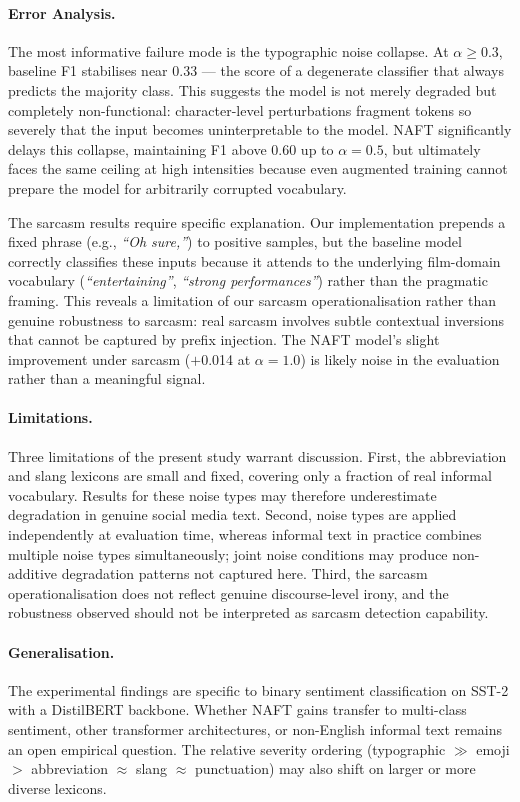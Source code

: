 \documentclass[sigconf]{acmart}
\begin{document}
\paragraph{Error Analysis.}
The most informative failure mode is the typographic noise
collapse.
At $\alpha \geq 0.3$, baseline F1 stabilises near 0.33 — the
score of a degenerate classifier that always predicts the majority
class.
This suggests the model is not merely degraded but completely
non-functional: character-level perturbations fragment tokens so
severely that the input becomes uninterpretable to the model.
NAFT significantly delays this collapse, maintaining F1 above 0.60
up to $\alpha=0.5$, but ultimately faces the same ceiling at high
intensities because even augmented training cannot prepare the
model for arbitrarily corrupted vocabulary.

The sarcasm results require specific explanation.
Our implementation prepends a fixed phrase (e.g.,
\textit{``Oh sure,''}) to positive samples, but the baseline
model correctly classifies these inputs because it attends to the
underlying film-domain vocabulary (\textit{``entertaining''},
\textit{``strong performances''}) rather than the pragmatic
framing.
This reveals a limitation of our sarcasm operationalisation rather
than genuine robustness to sarcasm: real sarcasm involves subtle
contextual inversions that cannot be captured by prefix injection.
The NAFT model's slight improvement under sarcasm ($+$0.014 at
$\alpha=1.0$) is likely noise in the evaluation rather than a
meaningful signal.

\paragraph{Limitations.}
Three limitations of the present study warrant discussion.
First, the abbreviation and slang lexicons are small and fixed,
covering only a fraction of real informal vocabulary.
Results for these noise types may therefore underestimate
degradation in genuine social media text.
Second, noise types are applied independently at evaluation time,
whereas informal text in practice combines multiple noise types
simultaneously; joint noise conditions may produce non-additive
degradation patterns not captured here.
Third, the sarcasm operationalisation does not reflect genuine
discourse-level irony, and the robustness observed should not be
interpreted as sarcasm detection capability.

\paragraph{Generalisation.}
The experimental findings are specific to binary sentiment
classification on SST-2 with a DistilBERT backbone.
Whether NAFT gains transfer to multi-class sentiment, other
transformer architectures, or non-English informal text remains
an open empirical question.
The relative severity ordering (typographic $\gg$ emoji $>$
abbreviation $\approx$ slang $\approx$ punctuation) may also shift
on larger or more diverse lexicons.
\end{document}
